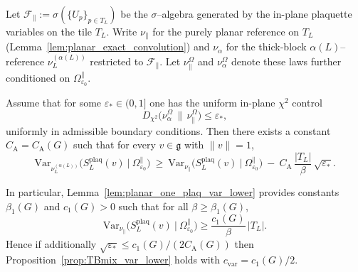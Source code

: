 \begin{proposition}\label{prop:B9_planA_reduction}
Let $\mathscr F_{\parallel}:=\sigma(\{U_p\}_{p\in T_L})$ be the $\sigma$--algebra generated by the in-plane plaquette variables on the tile $T_L$.
Write $\nu_{\parallel}$ for the purely planar reference on $T_L$ (Lemma~\ref{lem:planar_exact_convolution}) and
$\nu_{\alpha}$ for the thick-block $\alpha(L)$--reference $\nu_L^{(\alpha(L))}$ restricted to $\mathscr F_{\parallel}$.
Let $\nu_{\parallel}^{\Omega}$ and $\nu_{\alpha}^{\Omega}$ denote these laws further conditioned on $\Omega_{\varepsilon_0}^{\parallel}$.

Assume that for some $\varepsilon_{\ast}\in(0,1]$ one has the uniform in-plane $\chi^2$ control
\begin{equation}\label{eq:B9_planA_chi2_assump}
D_{\chi^2}\big(\nu_{\alpha}^{\Omega}\,\big\|\,\nu_{\parallel}^{\Omega}\big)\le \varepsilon_{\ast},
\end{equation}
uniformly in admissible boundary conditions.
Then there exists a constant $C_{\mathrm{A}}=C_{\mathrm{A}}(G)$ such that for every $v\in\mathfrak g$ with $\|v\|=1$,
\begin{equation}\label{eq:B9_planA_var_transfer}
\mathrm{Var}_{\nu_L^{(\alpha(L))}}\!\Big(S_L^{\mathrm{plaq}}(v)\ \Big|\ \Omega_{\varepsilon_0}^{\parallel}\Big)
\ \ge\
\mathrm{Var}_{\nu_{\parallel}}\!\Big(S_L^{\mathrm{plaq}}(v)\ \Big|\ \Omega_{\varepsilon_0}^{\parallel}\Big)
\ -\ 
C_{\mathrm{A}}\,\frac{|T_L|}{\beta}\,\sqrt{\varepsilon_{\ast}}.
\end{equation}

In particular, Lemma~\ref{lem:planar_one_plaq_var_lower} provides constants $\beta_1(G)$ and $c_1(G)>0$ such that for all $\beta\ge \beta_1(G)$,
\[
\mathrm{Var}_{\nu_{\parallel}}\!\Big(S_L^{\mathrm{plaq}}(v)\ \Big|\ \Omega_{\varepsilon_0}^{\parallel}\Big)\ge \frac{c_1(G)}{\beta}\,|T_L|.
\]
Hence if additionally $\sqrt{\varepsilon_{\ast}}\le c_1(G)/(2C_{\mathrm{A}}(G))$ then Proposition~\ref{prop:TBmix_var_lower} holds with $c_{\mathrm{var}}=c_1(G)/2$.
\end{proposition}

